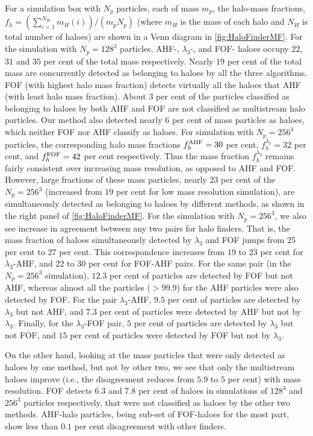 \documentclass[fleqn,usenatbib,useAMS]{mnras}
\begin{document}
For a simulation box with $N_p$ particles, each of mass $m_p$, the halo-mass fractions, $\displaystyle f_h = (\sum\limits_{i=1}^{N_H} m_H(i)) / (m_p N_p)$ (where $m_H$ is the mass of each halo and $N_H$ is total number of haloes) are shown in a Venn diagram in \autoref{fig:HaloFinderMF}. For the simulation with $N_p = 128^3$ particles, AHF-, $\lambda_3$-, and FOF- haloes occupy $22$, $31$ and $35$ per cent of the total mass respectively. Nearly $19$ per cent of the total mass are concurrently detected as belonging to haloes by all the three algorithms. FOF (with highest halo mass fraction) detects virtually all the haloes that AHF (with least halo mass fraction). About $3$ per cent of the particles classified as belonging to haloes by both AHF and FOF are not classified as multistream halo particles. Our method also detected nearly $6$ per cent of mass particles as haloes, which neither FOF nor AHF classify as haloes. For simulation with $N_p = 256^3$ particles, the corresponding halo mass fractions $f_h^{\rm AHF} = 30$ per cent, $f_h^{\lambda_3} = 32$ per cent, and $f_h^{\rm FOF} = 42$ per cent respectively. Thus the mass fraction $f_h^{\lambda_3}$ remains fairly consistent over increasing mass resolution, as opposed to AHF and FOF. However, large fractions of these mass particles, nearly $23$ per cent of the $N_p = 256^3$ (increased from $19$ per cent for low mass resolution simulation), are simultaneously detected as belonging to haloes by different methods, as shown in the right panel of \autoref{fig:HaloFinderMF}. For the simulation with $N_p = 256^3$, we also see increase in agreement between any two pairs for halo finders. That is, the mass fraction of haloes simultaneously detected by $\lambda_3$ and FOF jumps from $25$ per cent to $27$ per cent. This correspondence increases from $19$ to $23$ per cent for $\lambda_3$-AHF, and $22$ to $30$ per cent for FOF-AHF pairs. For the same pair (in the $N_p = 256^3$ simulation), $12.3$ per cent of particles are detected by FOF but not AHF, whereas almost all the particles ($>99.9$) for the AHF particles were also detected by FOF. For the pair $\lambda_3$-AHF, $9.5$ per cent of particles are detected by $\lambda_3$ but not AHF, and $7.3$ per cent of particles were detected by AHF but not by $\lambda_3$. Finally, for the $\lambda_3$-FOF pair, $5$ per cent of particles are detected by $\lambda_3$ but not FOF, and $15$ per cent of particles were detected by FOF but not by $\lambda_3$. 

On the other hand, looking at the mass particles that were only detected as haloes by one method, but not by other two, we see that only the multistream haloes improve (i.e., the disagreement reduces from $5.9$ to $5$ per cent) with mass resolution. FOF detects $6.3$ and $7.8$ per cent of haloes in simulations of $128^3$ and $256^3$ particles respectively, that were not classified as haloes by the other two methods. AHF-halo particles, being sub-set of FOF-haloes for the most part, show less than $0.1$ per cent disagreement with other finders.
\end{document}
